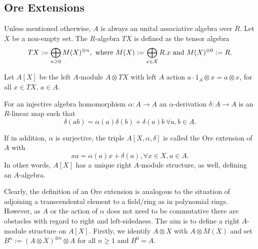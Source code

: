 \subsection{Ore Extensions}
Unless mentioned otherwise, $A$ is always an unital associative algebra over $R$. Let $X$ be a non-empty set. The $R$-algebra $T X$ is defined as the tensor algebra
$$T X := \bigoplus_{n \geq 0} M(X)^{\otimes n},\ \mathrm{where}\ M(X) := \bigoplus_{x \in X} R.x \ \mathrm{and}\ M(X)^{\otimes 0} := R.$$
\begin{defi}\label{defi02}
Let $A[X]$ be the left $A$-module $A \otimes T X$ with left $A$ action $a \cdot 1_A \otimes x = a \otimes x$, for all $x \in T X$, $a \in A$.
\bn
\item For an injective algebra homomorphism $\alpha : A \longrightarrow A$ an $\alpha$-derivation $\delta : A \longrightarrow A$ is an $R$-linear map such that
$$\delta(a b) = \alpha(a) \delta(b) + \delta(a) b\ \forall a, b \in A.$$
\item If in addition, $\alpha$ is surjective, the triple $A[X, \alpha, \delta]$ is called the Ore extension of $A$ with
$$x a = \alpha(a) x + \delta(a), \forall x \in X, a \in A.$$
In other words, $A[X]$ has a unique right $A$-module structure, as well, defining an $A$-algebra.%
\en
{}
\end{defi}
Clearly, the definition of an Ore extension is analogous to the situation of adjoining a transcendental element to a field/ring as in polynomial rings. However, as $A$ or the action of $\alpha$ does not need to be commutative there are obstacles with regard to right and left-sidedness. The aim is to define a right $A$-module structure on $A[X]$. Firstly, we identify $A \otimes X$ with $A \otimes M(X)$ and set $B^n := (A \otimes X)^{\otimes n} \otimes A$ for all $n \geq 1$ and $B^0 = A$.
